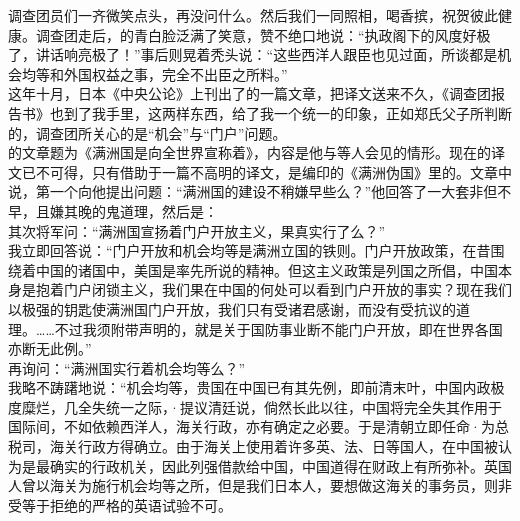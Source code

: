 调查团员们一齐微笑点头，再没问什么。然后我们一同照相，喝香摈，祝贺彼此健康。调查团走后，的青白脸泛满了笑意，赞不绝口地说：“执政阁下的风度好极了，讲话响亮极了！”事后则晃着秃头说：“这些西洋人跟臣也见过面，所谈都是机会均等和外国权益之事，完全不出臣之所料。”\\

这年十月，日本《中央公论》上刊出了的一篇文章，把译文送来不久，《调查团报告书》也到了我手里，这两样东西，给了我一个统一的印象，正如郑氏父子所判断的，调查团所关心的是“机会”与“门户”问题。\\

的文章题为《满洲国是向全世界宣称着》，内容是他与等人会见的情形。现在的译文已不可得，只有借助于一篇不高明的译文，是编印的《满洲伪国》里的。文章中说，第一个向他提出问题：“满洲国的建设不稍嫌早些么？”他回答了一大套非但不早，且嫌其晚的鬼道理，然后是：\\

其次将军问：“满洲国宣扬着门户开放主义，果真实行了么？”\\

我立即回答说：“门户开放和机会均等是满洲立国的铁则。门户开放政策，在昔围绕着中国的诸国中，美国是率先所说的精神。但这主义政策是列国之所倡，中国本身是抱着门户闭锁主义，我们果在中国的何处可以看到门户开放的事实？现在我们以极强的钥匙使满洲国门户开放，我们只有受诸君感谢，而没有受抗议的道理。……不过我须附带声明的，就是关于国防事业断不能门户开放，即在世界各国亦断无此例。”\\

再询问：“满洲国实行着机会均等么？”\\

我略不踌躇地说：“机会均等，贵国在中国已有其先例，即前清末叶，中国内政极度糜烂，几全失统一之际，·提议清廷说，倘然长此以往，中国将完全失其作用于国际间，不如依赖西洋人，海关行政，亦有确定之必要。于是清朝立即任命·为总税司，海关行政方得确立。由于海关上使用着许多英、法、日等国人，在中国被认为是最确实的行政机关，因此列强借款给中国，中国道得在财政上有所弥补。英国人曾以海关为施行机会均等之所，但是我们日本人，要想做这海关的事务员，则非受等于拒绝的严格的英语试验不可。\\

